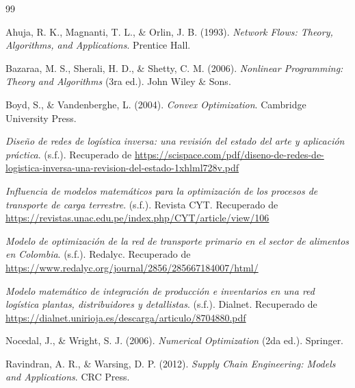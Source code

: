 \documentclass[12pt,a4paper]{article}
\begin{document}
\newpage
{}
\begin{thebibliography}{99}

Ahuja, R. K., Magnanti, T. L., \& Orlin, J. B. (1993). \textit{Network Flows: Theory, Algorithms, and Applications}. Prentice Hall.

Bazaraa, M. S., Sherali, H. D., \& Shetty, C. M. (2006). \textit{Nonlinear Programming: Theory and Algorithms} (3ra ed.). John Wiley \& Sons.

Boyd, S., \& Vandenberghe, L. (2004). \textit{Convex Optimization}. Cambridge University Press.

\textit{Diseño de redes de logística inversa: una revisión del estado del arte y aplicación práctica}. (s.f.). Recuperado de \url{https://scispace.com/pdf/diseno-de-redes-de-logistica-inversa-una-revision-del-estado-1xhlml728v.pdf}

\textit{Influencia de modelos matemáticos para la optimización de los procesos de transporte de carga terrestre}. (s.f.). Revista CYT. Recuperado de \url{https://revistas.unac.edu.pe/index.php/CYT/article/view/106}

\textit{Modelo de optimización de la red de transporte primario en el sector de alimentos en Colombia}. (s.f.). Redalyc. Recuperado de \url{https://www.redalyc.org/journal/2856/285667184007/html/}

\textit{Modelo matemático de integración de producción e inventarios en una red logística plantas, distribuidores y detallistas}. (s.f.). Dialnet. Recuperado de \url{https://dialnet.unirioja.es/descarga/articulo/8704880.pdf}

Nocedal, J., \& Wright, S. J. (2006). \textit{Numerical Optimization} (2da ed.). Springer.

Ravindran, A. R., \& Warsing, D. P. (2012). \textit{Supply Chain Engineering: Models and Applications}. CRC Press.

\end{thebibliography}
\end{document}
